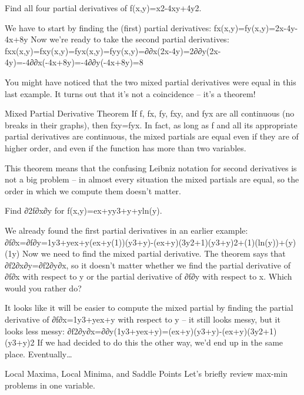 \begin{example}
Find all four partial derivatives of f(x,y)=x2-4xy+4y2.

\begin{solution}
  We have to start by finding the (first) partial derivatives:
fx(x,y)=fy(x,y)=2x-4y-4x+8y
Now we’re ready to take the second partial derivatives:
fxx(x,y)=fxy(x,y)=fyx(x,y)=fyy(x,y)=∂∂x(2x-4y)=2∂∂y(2x-4y)=-4∂∂x(-4x+8y)=-4∂∂y(-4x+8y)=8
\end{solution}\end{example}

You might have noticed that the two mixed partial derivatives were equal in this last example. It turns out that it's not a coincidence – it's a theorem!

Mixed Partial Derivative Theorem
If f, fx, fy, fxy, and fyx are all continuous (no breaks in their graphs), then
fxy=fyx.
In fact, as long as f and all its appropriate partial derivatives are continuous, the mixed partials are equal even if they are of higher order, and even if the function has more than two variables.

This theorem means that the confusing Leibniz notation for second derivatives is not a big problem – in almost every situation the mixed partials are equal, so the order in which we compute them doesn't matter.

\begin{example}
Find ∂2f∂x∂y for f(x,y)=ex+yy3+y+yln(y).

\begin{solution}
  We already found the first partial derivatives in an earlier example:
∂f∂x=∂f∂y=1y3+yex+y(ex+y(1))(y3+y)-(ex+y)(3y2+1)(y3+y)2+(1)(ln(y))+(y)(1y)
Now we need to find the mixed partial derivative. The theorem says that ∂f2∂x∂y=∂f2∂y∂x, so it doesn't matter whether we find the partial derivative of ∂f∂x with respect to y or the partial derivative of ∂f∂y with respect to x. Which would you rather do?

It looks like it will be easier to compute the mixed partial by finding the partial derivative of ∂f∂x=1y3+yex+y with respect to y – it still looks messy, but it looks less messy:
∂f2∂y∂x=∂∂y(1y3+yex+y)=(ex+y)(y3+y)-(ex+y)(3y2+1)(y3+y)2
If we had decided to do this the other way, we'd end up in the same place. Eventually…
\end{solution}\end{example}

Local Maxima, Local Minima, and Saddle Points
Let's briefly review max-min problems in one variable.

